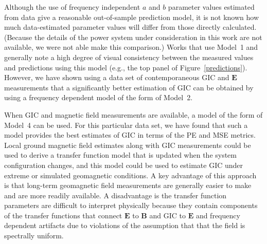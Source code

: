 \documentclass[draft,linenumbers]{agujournal2018}
\begin{document}
Although the use of frequency independent $a$ and $b$ parameter values estimated from data give a reasonable out-of-sample prediction model, it is not known how much data-estimated parameter values will differ from those directly calculated. (Because the details of the power system under consideration in this work are not available, we were not able make this comparison.) Works that use Model~1 and generally note a high degree of visual consistency between the measured values and predictions using this model (e.g., the top panel of Figure~\ref{predictions}). However, we have shown using a data set of contemporaneous GIC and $\mathbf{E}$ measurements that a significantly better estimation of GIC can be obtained by using a frequency dependent model of the form of Model~2. 


When GIC and magnetic field measurements are available, a model of the form of Model~4 can be used. For this particular data set, we have found that such a model provides the best estimates of GIC in terms of the PE and MSE metrics. Local ground magnetic field estimates along with GIC measurements could be used to derive a transfer function model that is updated when the system configuration changes, and this model could be used to estimate GIC under extreme or simulated geomagnetic conditions. A key advantage of this approach is that long-term geomagnetic field measurements are generally easier to make and are more readily available. A disadvantage is the transfer function parameters are difficult to interpret physically because they contain components of the transfer functions that connect $\mathbf{E}$ to $\mathbf{B}$ and GIC to $\mathbf{E}$ and frequency dependent artifacts due to violations of the assumption that that the field is spectrally uniform.

\end{document}
